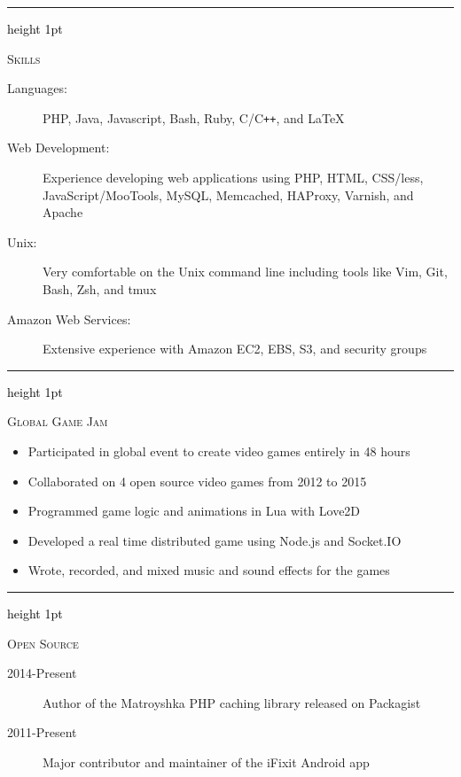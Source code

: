 \documentclass[letterpaper,10pt]{article}
\newcommand{\ressectiondivider}{
   \textcolor{black}{\hrule height 1pt}
}
\newcommand{\resitem}[1]{\item #1 \vspace{-2pt}}
\newenvironment{ressection}[1]{
   \vspace{12pt}
   \ressectiondivider
   \vspace{5pt}
   \begin{minipage}[t]{2.75cm}
      \flushleft
      \Large{\textrm{\textsc{#1}}}
   \end{minipage}
   \hfill
   \begin{minipage}[t]{16cm}
      \flushleft
}{
   \end{minipage}
}
\begin{document}
\begin{ressection}{Skills}
   \begin{description}
      \item[Languages:]
      PHP, Java, Javascript, Bash, Ruby, C/C{}\verb!++!, and \LaTeX
      \item[Web Development:]
      Experience developing web applications using PHP, HTML, CSS/less, JavaScript/MooTools, MySQL, Memcached, HAProxy, Varnish, and Apache
      \item[Unix:]
      Very comfortable on the Unix command line including tools like Vim, Git, Bash, Zsh, and tmux
      \item[Amazon Web Services:]
      Extensive experience with Amazon EC2, EBS, S3, and security groups
   \end{description}
\end{ressection}

\begin{ressection}{Global Game Jam}
   \begin{itemize}
      \resitem{Participated in global event to create video games entirely in 48 hours}
      \resitem{Collaborated on 4 open source video games from 2012 to 2015}
      \resitem{Programmed game logic and animations in Lua with Love2D}
      \resitem{Developed a real time distributed game using Node.js and Socket.IO}
      \resitem{Wrote, recorded, and mixed music and sound effects for the games}
   \end{itemize}
\end{ressection}

\begin{ressection}{Open Source}
   \begin{description}
      \item[2014-Present] Author of the Matroyshka PHP caching library released on Packagist
      \item[2011-Present] Major contributor and maintainer of the iFixit Android app
   \end{description}
\end{ressection}
\end{document}
